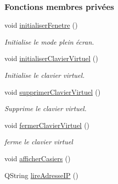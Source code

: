 \subsubsection*{Fonctions membres privées}
\begin{DoxyCompactItemize}
\item 
void \hyperlink{class_ihm_gestion_armoire_a3bd9b576cab980cae3dc591f412309fc}{initialiser\+Fenetre} ()
\begin{DoxyCompactList}\small\item\em Initialise le mode plein écran. \end{DoxyCompactList}\item 
void \hyperlink{class_ihm_gestion_armoire_a189ab3f034720597eedf3930631e6dd1}{initialiser\+Clavier\+Virtuel} ()
\begin{DoxyCompactList}\small\item\em Initialise le clavier virtuel. \end{DoxyCompactList}\item 
void \hyperlink{class_ihm_gestion_armoire_ac82ab8c9ad48f26ab928b7a72e4dcee0}{supprimer\+Clavier\+Virtuel} ()
\begin{DoxyCompactList}\small\item\em Supprime le clavier virtuel. \end{DoxyCompactList}\item 
void \hyperlink{class_ihm_gestion_armoire_a527e704e792dd5634b3c0a738a922429}{fermer\+Clavier\+Virtuel} ()
\begin{DoxyCompactList}\small\item\em ferme le clavier virtuel \end{DoxyCompactList}\item 
void \hyperlink{class_ihm_gestion_armoire_a04201173bd9ac135227ac56a6c22a999}{afficher\+Casiers} ()
\item 
Q\+String \hyperlink{class_ihm_gestion_armoire_a68b7ba5bc7f7475b35162b13d3b3db13}{lire\+Adresse\+IP} ()
\end{DoxyCompactItemize}

